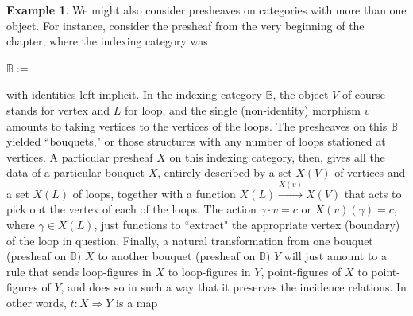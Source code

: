 \documentclass[a4paper]{book}
\theoremstyle{definition}
\newtheorem{example}{Example}[section]
\theoremstyle{definition}
\theoremstyle{definition}
\theoremstyle{theorem}
\theoremstyle{definition}
\begin{document}
		\begin{example}
			We might also consider presheaves on categories with more than one object. For instance, consider the presheaf from the very beginning of the chapter, where the indexing category was 
				\begin{center} 
				$\mathbb{B} :=$ 
			\end{center} 
		with identities left implicit. In the indexing category $\mathbb{B}$, the object $V$ of course stands for vertex and $L$ for loop, and the single (non-identity) morphism $v$ amounts to taking vertices to the vertices of the loops. The presheaves on this $\mathbb{B}$ yielded ``bouquets," or those structures with any number of loops stationed at vertices.  A particular presheaf $X$ on this indexing category, then, gives all the data of a particular bouquet $X$, entirely described by a set $X(V)$ of vertices and a set $X(L)$ of loops, together with a function $X(L) \xrightarrow{X(v)} X(V)$ that acts to pick out the vertex of each of the loops. The action $\gamma \cdot v = c$ or $X(v)(\gamma) = c$, where $\gamma \in X(L)$, just functions to ``extract" the appropriate vertex (boundary) of the loop in question. Finally, a natural transformation from one bouquet (presheaf on $\mathbb{B}$) $X$ to another bouquet (presheaf on $\mathbb{B}$) $Y$ will just amount to a rule that sends loop-figures in $X$ to loop-figures in $Y$, point-figures of $X$ to point-figures of $Y$, and does so in such a way that it preserves the incidence relations. In other words, $t: X \Rightarrow Y$ is a map 
			\begin{center}
\end{center}
\end{example}
\end{document}
